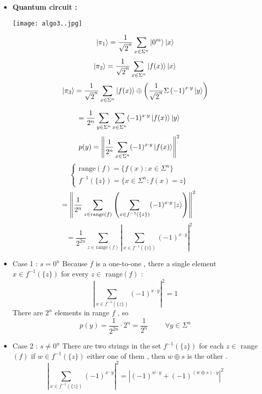 \documentclass[12pt]{beamer}
\begin{document}
\begin{frame}
\begin{itemize}
 \item\textbf{Quantum circuit :}
    \begin{center}
        \texttt{[image: algo3..jpg]}
    \end{center}
\[
\ket{\pi_1}=\frac{1}{\sqrt{2}^n}\sum_{x\in\Sigma^n}\ket{0^m}\ket{x}
\]
\[
\ket{\pi_2}=\frac{1}{\sqrt{2}^n}\sum_{x\in\Sigma^n}\ket{f(x)}\ket{x}
\]
\[
\ket{\pi_3}=\frac{1}{\sqrt{2}^n}\sum_{x\in\Sigma^n}\ket{f(x)}\oplus\left(\frac{1}{\sqrt{2}^n}\Sigma\left(-1\right)^{x\cdot y}\ket{y}\right)
\]
\end{itemize}
\end{frame}
\begin{frame}
\[
=\frac{1}{2^n}\sum_{y\in\Sigma^n}\sum_{x\in\Sigma^n} (-1)^{x\cdot y}\ket{f(x)}\ket{y}
\]
\[
p(y) = \left\lVert \frac{1}{2^n}\sum_{x\in\Sigma^n} (-1)^{x\cdot y}\ket{f(x)} \right\rVert^2
\]
\[
\begin{cases}
\text{range}(f) = \{ f(x) : x \in \Sigma^n \} \\
f^{-1}(\{ z \}) = \{ x \in \Sigma^n : f(x) = z \}
\end{cases}
\]
\[
= \left\lVert \frac{1}{2^n}\sum_{z\in\text{range}(f)} \left(\sum_{x\in f^{-1}(\{z\})}(-1)^{x\cdot y}\ket{z} \right)\right\rVert^2
\]
\[
=\frac{1}{2^{2n}}\sum_{z\in\text{range}\left(f\right)}\left|\sum_{x\in f^{-1}(\{z\})}(-1)^{x\cdot y}\right|^2
\]
\end{frame}
\begin{frame}
\begin{itemize}
\item{Case 1 :}
$s=0^n$
Because \(f\) is a one-to-one , there a single element \(x\in f^{-1}(\{z\})\) for every \(z\in\) range\((f)\) :
\[
\left|\sum_{x\in f^{-1}(\{z\})}(-1)^{x\cdot y}\right|^2=1
\]
There are \(2^n\) elements in range \(f\) , so
\[
p(y)=\frac{1}{2^{2n}}\cdot 2^n=\frac{1}{2^n}\hspace{1cm}\forall y\in \Sigma^n
\]
\item{Case 2 :}
$s\neq 0^n$
There are two strings in the set \( f^{-1}(\{z\})\) for each \(z\in\) range \(\left(f\right)\) if \( w\in f^{-1}(\{z\})\) either one of them , then \( w\oplus s\) is the other .
\[
\left|\sum_{x\in f^{-1}(\{z\})}(-1)^{x\cdot y}\right|^2=\left|(-1)^{w\cdot y}+(-1)^{\left(w\oplus s\right)\cdot y}\right|^2
\]
\end{itemize}
\end{frame}
\end{document}
